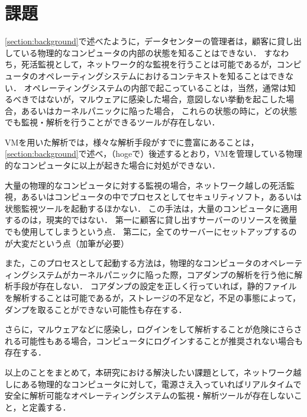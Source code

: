 \section{課題}
\label{section:problem}

\ref{section:background}で述べたように，データセンターの管理者は，顧客に貸し出している物理的なコンピュータの内部の状態を知ることはできない．
すなわち，死活監視として，ネットワーク的な監視を行うことは可能であるが，コンピュータのオペレーティングシステムにおけるコンテキストを知ることはできない．
オペレーティングシステムの内部で起こっていることは，当然，通常は知るべきではないが，マルウェアに感染した場合，意図しない挙動を起こした場合，あるいはカーネルパニックに陥った場合，
これらの状態の時に，どの状態でも監視・解析を行うことができるツールが存在しない．

VMを用いた解析では，様々な解析手段がすでに豊富にあることは，\ref{section:background}で述べ，（hogeで）後述するとおり，VMを管理している物理的なコンピュータに以上が起きた場合に対処ができない．

大量の物理的なコンピュータに対する監視の場合，ネットワーク越しの死活監視，あるいはコンピュータの中でプロセスとしてセキュリティソフト，あるいは状態監視ツールを起動するほかない．
この手法は，大量のコンピュータに適用するのは，現実的ではない．
第一に顧客に貸し出すサーバーのリソースを微量でも使用してしまうという点．
第二に，全てのサーバーにセットアップするのが大変だという点（加筆が必要）

また，このプロセスとして起動する方法は，物理的なコンピュータのオペレーティングシステムがカーネルパニックに陥った際，コアダンプの解析を行う他に解析手段が存在しない．
コアダンプの設定を正しく行っていれば，静的ファイルを解析することは可能であるが，ストレージの不足など，不足の事態によって，ダンプを取ることができない可能性も存在する．

さらに，マルウェアなどに感染し，ログインをして解析することが危険にさらされる可能性もある場合，コンピュータにログインすることが推奨されない場合も存在する．

以上のことをまとめて，本研究における解決したい課題として，ネットワーク越しにある物理的なコンピュータに対して，電源さえ入っていればリアルタイムで安全に解析可能なオペレーティングシステムの監視・解析ツールが存在しないこと，と定義する．



